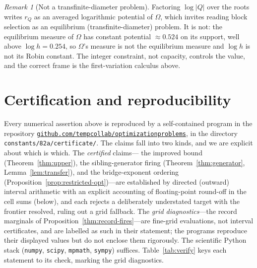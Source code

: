 \documentclass[11pt,reqno]{amsart}
\theoremstyle{plain}
\theoremstyle{definition}
\theoremstyle{remark}
\newtheorem{remark}[theorem]{Remark}
\newcommand{\rQ}{r_Q}
\newcommand{\repo}{\href{https://github.com/tempcollab/optimizationproblems/tree/main/constants/82a}{\texttt{github.com/tempcollab/optimizationproblems}}}
\begin{document}
\begin{remark}[Not a transfinite-diameter problem]\label{rem:noteq}
Factoring $\log|Q|$ over the roots writes $\rQ$ as an averaged logarithmic potential
of $\Omega$, which invites reading block selection as an equilibrium
(transfinite-diameter) problem. It is not: the equilibrium measure of $\Omega$ has
constant potential $\approx0.524$ on its support, well above $\log h=0.254$, so
$\Omega$'s measure is not the equilibrium measure and $\log h$ is not its Robin
constant. The integer constraint, not capacity, controls the value, and the correct
frame is the first-variation calculus above.
\end{remark}

\section{Certification and reproducibility}\label{sec:verify}

Every numerical assertion above is reproduced by a self-contained program in the
repository \repo, in the directory \texttt{constants/82a/certificate/}. The claims fall
into two kinds, and we are explicit about which is which. The \emph{certified} claims---
the improved bound (Theorem~\ref{thm:upper}), the sibling-generator firing
(Theorem~\ref{thm:generator}, Lemma~\ref{lem:transfer}), and the bridge-exponent ordering
(Proposition~\ref{prop:restricted-opt})---are established by directed (outward) interval
arithmetic with an explicit accounting of floating-point round-off in the cell sums
(below), and each rejects a deliberately understated target with the frontier resolved,
ruling out a grid fallback. The \emph{grid diagnostics}---the record marginals of
Proposition~\ref{thm:record-fires}---are fine-grid evaluations, not interval certificates,
and are labelled as such in their statement; the programs reproduce their displayed
values but do not enclose them rigorously. The scientific Python stack
(\texttt{numpy}, \texttt{scipy}, \texttt{mpmath}, \texttt{sympy}) suffices.
Table~\ref{tab:verify} keys each statement to its check, marking the grid diagnostics.
\end{document}
